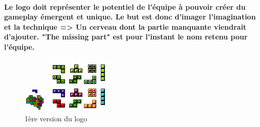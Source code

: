 \documentclass{report}
\begin{document}
\paragraph{Le logo doit repr\'{e}senter le potentiel de l'\'{e}quipe à pouvoir cr\'{e}er du gameplay \'{e}mergent et unique. Le but est donc d'imager l'imagination et la technique => Un cerveau dont la partie manquante viendrait d'ajouter. "The missing part" est pour l'instant le nom retenu pour l'\'{e}quipe.}


\begin{figure}[h!]
	\centering
	\begin{minipage}{.33\textwidth}
		\centering
	  	\includegraphics[width=\linewidth]{Team_logo_003.png}
	  	\caption{1\`{e}re version du logo}
		\label{fig:sub1}
	\end{minipage}%
	\begin{minipage}{.33\textwidth}
		\centering
		\includegraphics[width=\linewidth]{Team_logo_002.png}

\end{minipage}
\end{figure}
\end{document}
